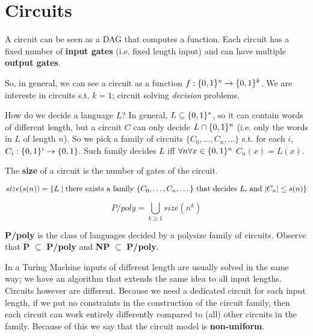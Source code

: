 \section{Circuits}\label{sec:circuits}

A circuit can be seen as a DAG that computes a function.
Each circuit has a fixed number of \textbf{input gates} (i.e. fixed length input) and can have multiple \textbf{output gates}.

So, in general, we can see a circuit as a function $f : \{ 0,1 \}^n \rightarrow \{ 0,1 \}^k$.
We are intereste in circuits s.t. $k = 1$; circuit solving \textit{decision} problems.

\def\circfamily{\{ C_0, \dots, C_n, \dots \}}
How do we decide a language $L$?
In general, $L \subseteq \{ 0,1 \}^*$, so it can contain words of different length, but a circuit $C$ can only decide $L \cap \{ 0,1 \}^n$ (i.e. only the words in $L$ of length $n$).
So we pick a family of circuits $\circfamily$ s.t. for each $i$, $C_i : \{ 0,1 \}^i \rightarrow \{ 0,1 \}$.
Such family decides $L$ iff $\forall n \forall x \in \{ 0,1 \}^n$ $C_n(x) = L(x)$.

\begin{definition}\label{def:circ_size}
    The \textbf{size} of a circuit is the number of gates of the circuit.
\end{definition}

\begin{definition}\label{def:circ_sn_class}
    \[ size(s(n)) = \{ L \st \text{there exists a family } \circfamily \text{ that decides } L \text{, and } \cardinality{C_n} \leq s(n) \} \]    
\end{definition}


\begin{definition}\label{def:ppoly}
    \[ P/poly = \bigcup_{k \geq 1} size(n^k) \]
\end{definition}

\textbf{P/poly} is the class of languages decided by a polysize family of circuits.
Observe that \textbf{P} $\subseteq$ \textbf{P/poly} and \textbf{NP} $\subseteq$ \textbf{P/poly}.

In a Turing Machine inputs of different length are usually solved in the same way; we have an algorithm that extends the same idea to all input lengths.
Circuits however are different. Because we need a dedicated circuit for each input length, if we put no constraints in the construction of the circuit family, then each circuit can work entirely differently compared to (all) other circuits in the family.
Because of this we say that the circuit model is \textbf{non-uniform}.

